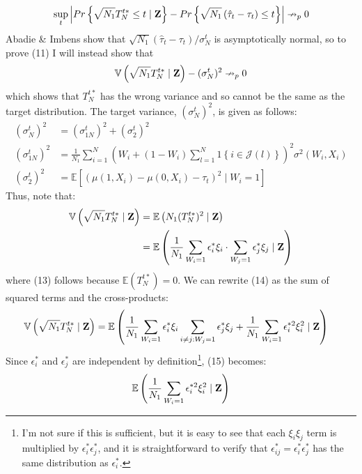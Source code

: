 \documentclass[10pt,letterpaper]{article}
\begin{document}
\begin{align}
\sup_t \left\lvert Pr\left\{ \sqrt{N_1} T_N^{t*} \leq t \mid \bold{Z} \right\} - Pr \left\{ \sqrt{N_1} \left( \hat{\tau}_t - \tau_t \right) \leq t \right\} \right\rvert \nrightarrow_p 0
\end{align}
Abadie \& Imbens show that $\sqrt{N_1}(\hat{\tau}_t - \tau_t)/\sigma^t_N$ is asymptotically normal, so to prove (11) I will instead show that
\begin{align}
\mathbb{V}\left( \sqrt{N_1} T_N^{t*} \mid \bold{Z} \right) - (\sigma^t_N)^2 \nrightarrow_p 0
\end{align}
which shows that $T_N^{t*}$ has the wrong variance and so cannot be the same as the target distribution. The target variance, $(\sigma^t_N)^2$, is given as follows:
\begin{align}
(\sigma^t_N)^2 &= (\sigma^t_{1N})^2 + (\sigma^t_2)^2 \nonumber \\
(\sigma^t_{1N})^2 &= \frac{1}{N_1} \sum_{i = 1}^{N} \left( W_i + (1-W_i)\sum_{l=1}^{N} 1\left\{i \in \mathcal{J}(l)\right\}\right)^2 \sigma^2(W_i, X_i) \nonumber \\
(\sigma^t_2)^2 &= \mathbb{E}\left[\left(\mu(1,X_i) - \mu(0,X_i) - \tau_t \right)^2\mid W_i = 1 \right] \nonumber
\end{align}
Thus, note that:
\begin{align}
\mathbb{V}\left(\sqrt{N_1} T_N^{t*} \mid \bold{Z} \right) &= \mathbb{E}\left( N_1 (T_N^{t*})^2 \mid \bold{Z}\right) \\
&= \mathbb{E}\left( \frac{1}{N_1} \sum_{W_i = 1} \epsilon_i^* \xi_i \cdot \sum_{W_j = 1} \epsilon_j^* \xi_j  \mid \bold{Z} \right)
\end{align}
where (13) follows because $\mathbb{E}(T_N^{t*}) = 0$. We can rewrite (14) as the sum of squared terms and the cross-products:
\begin{align}
\mathbb{V}\left(\sqrt{N_1} T_N^{t*} \mid \bold{Z} \right) &= \mathbb{E} \left( \frac{1}{N_1} \sum_{W_i = 1} \epsilon_i^* \xi_i  \sum_{i \neq j: W_j = 1} \epsilon_j^* \xi_j + \frac{1}{N_1} \sum_{W_i = 1} \epsilon_i^{*2} \xi_i^2 \mid \bold{Z} \right)
\end{align}
Since $\epsilon_i^*$ and $\epsilon_j^*$ are independent by definition\footnote{I'm not sure if this is sufficient, but it is easy to see that each $\xi_i \xi_j$ term is multiplied by $\epsilon_i^* \epsilon_j^*$, and it is straightforward to verify that $\epsilon_{ij}^* = \epsilon_i^* \epsilon_j^*$ has the same distribution as $\epsilon_i^*$.}, (15) becomes:
\begin{align}
\mathbb{E}\left( \frac{1}{N_1} \sum_{W_i = 1} \epsilon_i^{*2} \xi_i^2 \mid \bold{Z} \right)
\end{align}
\end{document}
